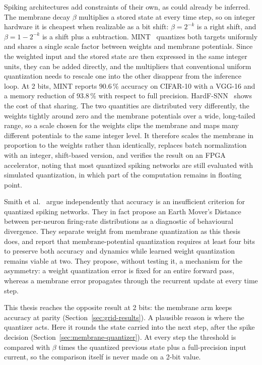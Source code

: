 Spiking architectures add constraints of their own, as could already be inferred.
The membrane decay $\beta$
multiplies a stored state at every time step, so on integer hardware it is
cheapest when realizable as a bit shift: $\beta = 2^{-k}$ is a right shift, and
$\beta = 1 - 2^{-k}$ is a shift plus a subtraction. MINT~\cite{yin2024mint}
quantizes both targets uniformly and shares a single
scale factor between weights and membrane potentials. Since the weighted input
and the stored state are then expressed in the same integer units, they can be
added directly, and the multipliers that conventional uniform quantization needs
to rescale one into the other disappear from the inference loop. At 2 bits,
MINT reports $90.6\,\%$ accuracy on CIFAR-10 with a VGG-16 and a memory
reduction of $93.8\,\%$ with respect to full precision.
HardF-SNN~\cite{liu2026hardfsnn} shows the cost of that sharing. The two
quantities are distributed very differently, the weights tightly around zero
and the membrane potentials over a wide, long-tailed range, so a scale chosen
for the weights clips the membrane and maps many different potentials to the
same integer level. It therefore scales the membrane in proportion to the weights rather
than identically, replaces batch normalization with an integer, shift-based
version, and verifies the result on an FPGA accelerator, noting that most
quantized spiking networks are still evaluated with simulated quantization, in
which part of the computation remains in floating point.

Smith et al.~\cite{smith2026} argue independently that accuracy is an
insufficient criterion for quantized spiking networks. They in fact propose an Earth
Mover's Distance between per-neuron firing-rate distributions as a diagnostic of
behavioural divergence. They separate weight from membrane quantization as this
thesis does, and report that membrane-potential quantization requires at least
four bits to preserve both accuracy and dynamics while learned weight
quantization remains viable at two. They propose, without testing it, a mechanism for the asymmetry: a
weight quantization error is fixed for an entire forward pass, whereas a membrane
error propagates through the recurrent update at every time step.

This thesis reaches the opposite result at 2 bits: the membrane arm keeps
accuracy at parity (Section~\ref{sec:grid-results}). A plausible reason is where
the quantizer acts. Here it rounds the state carried into the next step, after
the spike decision (Section~\ref{sec:membrane-quantizer}). At every step the
threshold is compared with $\beta$ times the quantized previous state plus a
full-precision input current, so the comparison itself is never made on a 2-bit
value.

